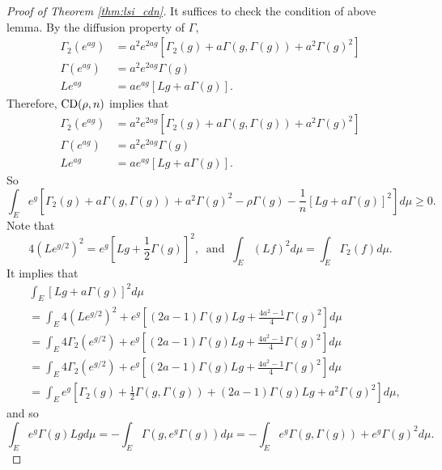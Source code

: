 \begin{proof}[Proof of Theorem \ref{thm:lsi_cdn}]
    It suffices to check the condition of above lemma. By the diffusion property of $\Gamma$,
    \begin{align*}
        \Gamma_2\left(e^{a g}\right) & =a^2 e^{2 a g}\left[\Gamma_2(g)+a \Gamma(g, \Gamma(g))+a^2 \Gamma(g)^2\right] \\
        \Gamma\left(e^{a g}\right) & =a^2 e^{2 a g} \Gamma(g) \\
        L e^{a g} & =a e^{a g}[L g+a \Gamma(g)] .
    \end{align*}
    Therefore, $\operatorname{CD}(\rho,n)$ implies that
    \begin{align*}
        \Gamma_2\left(e^{a g}\right) & =a^2 e^{2 a g}\left[\Gamma_2(g)+a \Gamma(g, \Gamma(g))+a^2 \Gamma(g)^2\right] \\
        \Gamma\left(e^{a g}\right) & =a^2 e^{2 a g} \Gamma(g) \\
        L e^{a g} & =a e^{a g}[L g+a \Gamma(g)] .
    \end{align*}
    So
    \begin{equation*}
        \int_E e^g\left[\Gamma_2(g)+a \Gamma(g, \Gamma(g))+a^2 \Gamma(g)^2-\rho \Gamma(g)-\frac{1}{n}[L g+a \Gamma(g)]^2\right] d \mu \geq 0 .
    \end{equation*}
    Note that
    \begin{equation*}
        4\left(L e^{g / 2}\right)^2=e^g\left[L g+\frac{1}{2} \Gamma(g)\right]^2,~\text{ and }~\int_E(L f)^2 d \mu=\int_E \Gamma_2(f) d \mu.
    \end{equation*}
    It implies that
    \begin{align*}
        & \int_E[L g+a \Gamma(g)]^2 d \mu \\
        & =\int_E 4\left(L e^{g / 2}\right)^2+e^g\left[(2 a-1) \Gamma(g) L g+\frac{4 a^2-1}{4} \Gamma(g)^2\right] d \mu \\
        & =\int_E 4 \Gamma_2\left(e^{g / 2}\right)+e^g\left[(2 a-1) \Gamma(g) L g+\frac{4 a^2-1}{4} \Gamma(g)^2\right] d \mu \\
        & =\int_E 4 \Gamma_2\left(e^{g / 2}\right)+e^g\left[(2 a-1) \Gamma(g) L g+\frac{4 a^2-1}{4} \Gamma(g)^2\right] d \mu \\
        & =\int_E e^g\left[\Gamma_2(g)+\frac{1}{2} \Gamma(g, \Gamma(g))+(2 a-1) \Gamma(g) L g+a^2 \Gamma(g)^2\right] d \mu,
    \end{align*}
    and so
    \begin{equation*}
        \int_E e^g \Gamma(g) L g d \mu=-\int_E \Gamma\left(g, e^g \Gamma(g)\right) d \mu=-\int_E e^g \Gamma(g, \Gamma(g))+e^g \Gamma(g)^2 d \mu.

\end{equation*}
\end{proof}
